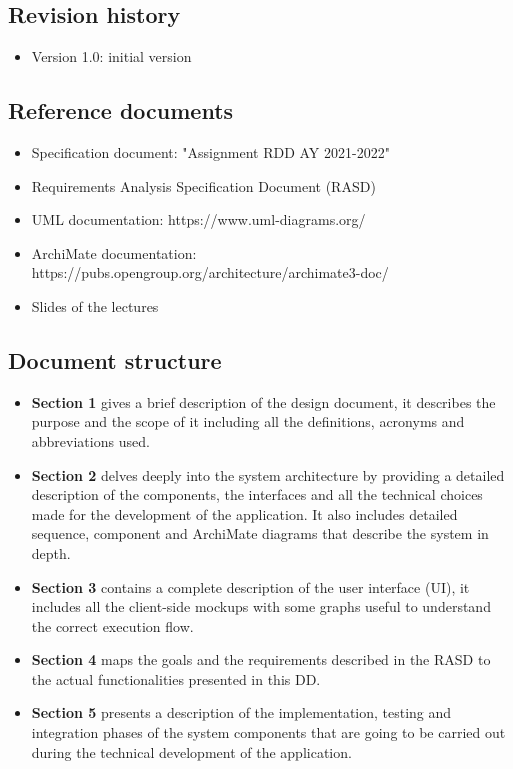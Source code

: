 \documentclass[table, 12pt]{article}
\begin{document}
\subsection{Revision history}
\begin{itemize}
    \item Version 1.0: initial version
\end{itemize}
\subsection{Reference documents}
\begin{itemize}
    \item Specification document: "Assignment RDD AY 2021-2022"
    \item Requirements Analysis Specification Document (RASD)
    \item UML documentation: https://www.uml-diagrams.org/
    \item ArchiMate documentation: https://pubs.opengroup.org/architecture/archimate3-doc/
    \item Slides of the lectures
\end{itemize}
\subsection{Document structure}
\begin{itemize}
    \item \textbf{Section 1} gives a brief description of the design document, it describes the purpose and the scope of it including all the definitions, acronyms and abbreviations used. 
    \item \textbf{Section 2} delves deeply into the system architecture by providing a detailed description of the components, the interfaces and all the technical choices made for the development of the application.
    It also includes detailed sequence, component and ArchiMate diagrams that describe the system in depth.
    \item \textbf{Section 3} contains a complete description of the user interface (UI), it includes all the client-side mockups with some graphs useful to understand the correct execution flow.
    \item \textbf{Section 4} maps the goals and the requirements described in the RASD to the actual functionalities presented in this DD.
    \item \textbf{Section 5} presents a description of the implementation, testing and integration phases of the system components that are going to be carried out during the technical development of the application.
\end{itemize}
\end{document}
